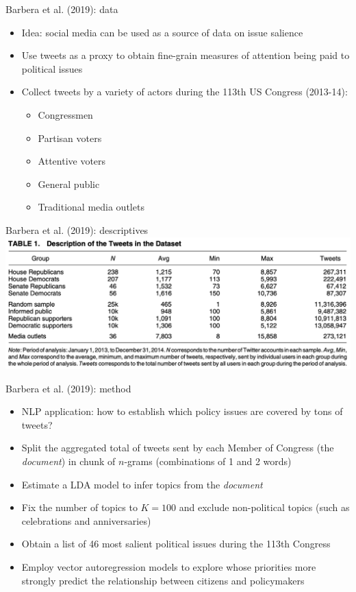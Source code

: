 \documentclass[english]{beamer}
\begin{document}
\begin{frame}{Barbera et al. (2019): data}
 \begin{itemize}\setlength{\itemsep}{1.2em}
        \item Idea: social media can be used as a source of data on issue salience
        \item Use tweets as a proxy to obtain fine-grain measures of attention being paid to political issues
        \item Collect tweets by a variety of actors during the 113th US Congress (2013-14):
        \begin{itemize}\setlength{\itemsep}{0.6em}\vspace{5pt}
            \item Congressmen
            \item Partisan voters
            \item Attentive voters
            \item General public
            \item Traditional media outlets
        \end{itemize}
    \end{itemize}
\end{frame}

\begin{frame}{Barbera et al. (2019): descriptives}
\centering
    \includegraphics[width=1 \textwidth]{Images/barbera_desc.png}
\end{frame}



\begin{frame}{Barbera et al. (2019): method}
    \begin{itemize}\setlength{\itemsep}{0.8em}
        \item NLP application: how to establish which policy issues are covered by tons of tweets?
        \item Split the aggregated total of tweets sent by each Member of Congress (the \textit{document}) in chunk of $n$-grams (combinations of 1 and 2 words)
        \item Estimate a LDA model to infer topics from the \textit{document}
        \item Fix the number of topics to $K = 100$ and exclude non-political topics (such as celebrations and anniversaries)
        \item Obtain a list of 46 most salient political issues during the 113th Congress
        \item Employ vector autoregression models to explore whose priorities more strongly predict the relationship between citizens and policymakers
    \end{itemize}
\end{frame}
\end{document}

